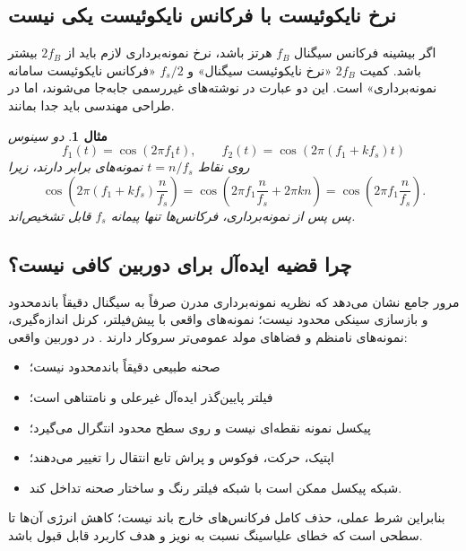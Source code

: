 \documentclass[12pt,openany,oneside]{book}
\newtheorem{example}{مثال}[chapter]
\begin{document}
\subsection{نرخ نایکوئیست با فرکانس نایکوئیست یکی نیست}

اگر بیشینه فرکانس سیگنال \(f_B\) هرتز باشد، نرخ نمونه‌برداری لازم باید از \(2f_B\) بیشتر باشد.
کمیت \(2f_B\) «نرخ نایکوئیست سیگنال» و \(f_s/2\) «فرکانس نایکوئیست سامانه نمونه‌برداری» است.
این دو عبارت در نوشته‌های غیررسمی جابه‌جا می‌شوند، اما در طراحی مهندسی باید جدا بمانند.

\begin{example}
دو سینوس
\begin{equation}
f_1(t)=\cos(2\pi f_1t),\qquad
f_2(t)=\cos(2\pi(f_1+kf_s)t)
\end{equation}
روی نقاط \(t=n/f_s\) نمونه‌های برابر دارند، زیرا
\begin{equation}
\cos\!\left(2\pi(f_1+kf_s)\frac{n}{f_s}\right)
=\cos\!\left(2\pi f_1\frac{n}{f_s}+2\pi kn\right)
=\cos\!\left(2\pi f_1\frac{n}{f_s}\right).
\end{equation}
پس پس از نمونه‌برداری، فرکانس‌ها تنها پیمانه \(f_s\) قابل تشخیص‌اند.
\end{example}

\subsection{چرا قضیه ایده‌آل برای دوربین کافی نیست؟}

مرور جامع  نشان می‌دهد که نظریه نمونه‌برداری مدرن صرفاً به سیگنال دقیقاً باند‌محدود
و بازسازی سینکی محدود نیست؛ نمونه‌های واقعی با پیش‌فیلتر، کرنل اندازه‌گیری، نمونه‌های نامنظم
و فضاهای مولد عمومی‌تر سروکار دارند \cite{unser2000sampling,papoulis1977generalized,unser2000generalized}.
در دوربین واقعی:
\begin{itemize}
\item صحنه طبیعی دقیقاً باند‌محدود نیست؛
\item فیلتر پایین‌گذر ایده‌آل غیرعلی و نامتناهی است؛
\item پیکسل نمونه نقطه‌ای نیست و روی سطح محدود انتگرال می‌گیرد؛
\item اپتیک، حرکت، فوکوس و پراش تابع انتقال را تغییر می‌دهند؛
\item شبکه پیکسل ممکن است با شبکه فیلتر رنگ و ساختار صحنه تداخل کند.
\end{itemize}
بنابراین شرط عملی، حذف کامل فرکانس‌های خارج باند نیست؛ کاهش انرژی آن‌ها تا سطحی است که
خطای علیاسینگ نسبت به نویز و هدف کاربرد قابل قبول باشد.
\end{document}
